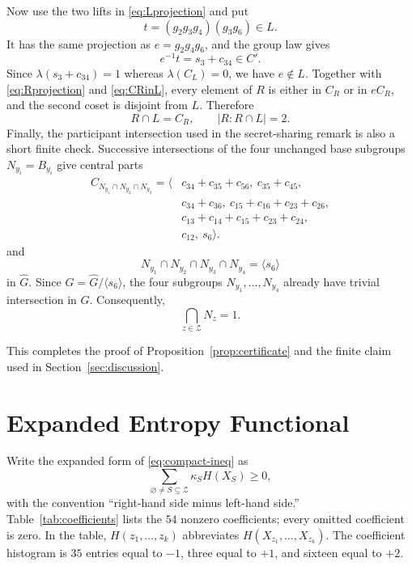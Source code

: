 \documentclass[journal]{IEEEtran}
\begin{document}
Now use the two lifts in \eqref{eq:Lprojection} and put
\[
 t=(g_2g_3g_4)(g_3g_6)\in L.
\]
It has the same projection as $e=g_2g_4g_6$, and the group law gives
\[
 e^{-1}t=s_3+c_{34}\in C'.
\]
Since $\lambda(s_3+c_{34})=1$ whereas $\lambda(C_L)=0$, we have $e\notin L$.
Together with \eqref{eq:Rprojection} and \eqref{eq:CRinL}, every element of
$R$ is either in $C_R$ or in $eC_R$, and the second coset is disjoint from
$L$.  Therefore
\[
 R\cap L=C_R,
 \qquad
 |R:R\cap L|=2.
\]
Finally, the participant intersection used in the secret-sharing remark is
also a short finite check.  Successive intersections of the four unchanged
base subgroups $N_{y_i}=B_{y_i}$ give central parts
\begin{align*}
C_{N_{y_1}\cap N_{y_2}\cap N_{y_3}}=\langle{}&
 c_{34}+c_{35}+c_{56},\ c_{35}+c_{45},\\
&c_{34}+c_{36},\ c_{15}+c_{16}+c_{23}+c_{26},\\
&c_{13}+c_{14}+c_{15}+c_{23}+c_{24},\\
&c_{12},\ s_6\rangle.
\end{align*}
and
\[
 N_{y_1}\cap N_{y_2}\cap N_{y_3}\cap N_{y_4}=\langle s_6\rangle
\]
in $\widehat G$.  Since $G=\widehat G/\langle s_6\rangle$, the four
subgroups $N_{y_1},\ldots,N_{y_4}$ already have trivial intersection in $G$.
Consequently,
\[
  \bigcap_{z\in\mathcal Z}N_z=1.
\]

This completes the proof of Proposition~\ref{prop:certificate} and the finite
claim used in Section~\ref{sec:discussion}.


\section{Expanded Entropy Functional}\label{app:coefficients}
Write the expanded form of \eqref{eq:compact-ineq} as
\[
  \sum_{\varnothing\ne S\subseteq\mathcal Z}\kappa_S H(X_S)\ge0,
\]
with the convention ``right-hand side minus left-hand side.''  Table~\ref{tab:coefficients}
lists the $54$ nonzero coefficients; every omitted coefficient is zero.  In
the table, $H(z_1,\ldots,z_k)$ abbreviates
$H(X_{z_1},\ldots,X_{z_k})$.  The coefficient histogram is $35$ entries equal
to $-1$, three equal to $+1$, and sixteen equal to $+2$.
\end{document}
